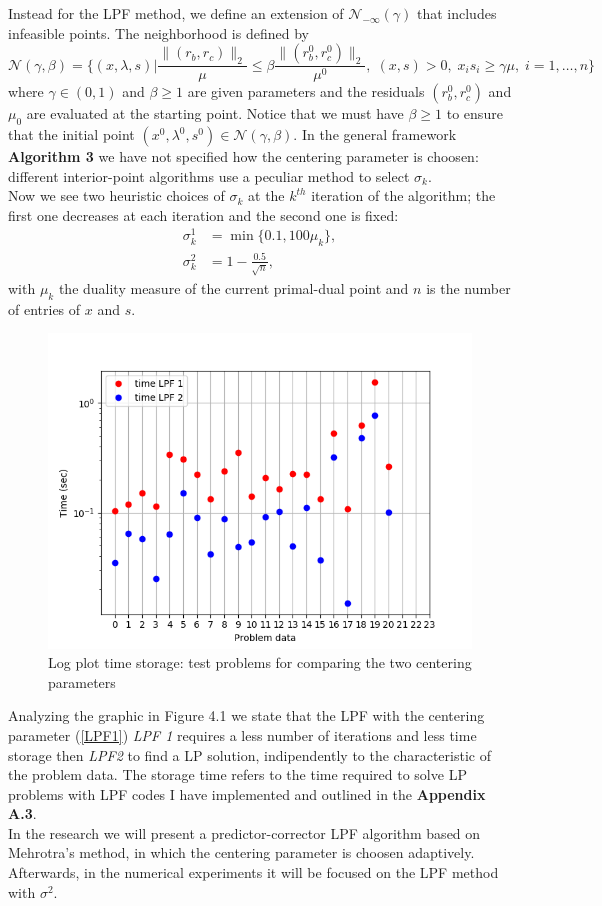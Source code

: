 \documentclass[a4paper,10 pt,titlepage,twoside]{book}
\theoremstyle{plain}
\theoremstyle{definition}
\theoremstyle{remark}
\begin{document}
Instead for the LPF method, we define an extension of $\mathcal{N}_{-\infty}(\gamma)$ that includes infeasible points. The neighborhood is defined by
 \begin{equation}\label{neigh3}
\mathcal{N}(\gamma,\beta) =\Bigg\{(x, \lambda, s) | \frac{\lVert(r_{b}, r_{c})\rVert_{2}}{\mu} \leq \beta\frac{\lVert(r_{b}^{0}, r_{c}^{0})\rVert_{2}}{\mu^{0}},\; (x, s)>0,\; x_{i}s_{i} \geq \gamma\mu,\;i = 1,\dots, n \Bigg\}
\end{equation}
where $\gamma\in(0,1)$ and $\beta \geq 1$ are given parameters and the residuals $(r_{b}^{0}, r_{c}^{0})$ and $\mu_{0}$ are evaluated at the starting point. Notice that we must have $\beta \geq 1$ to ensure that the initial point $(x^{0}, \lambda^{0}, s^{0})\in\mathcal{N}(\gamma,\beta)$.
In the general framework \textbf{Algorithm 3} we have not specified how the centering parameter is choosen: different interior-point algorithms use a peculiar method to select $\sigma_{k}$.\\
Now we see two heuristic choices of $\sigma_{k}$ at the $k^{th}$ iteration of the algorithm; the first one decreases at each iteration and the second one is fixed: 
\begin{align}
\sigma^{1}_{k} &= \min\{0.1, 100\mu_{k} \},\label{LPF1}\tag{4.13a}\\
\sigma^{2}_{k} &= 1 -\frac{0.5}{\sqrt{n}},\tag{4.13b}\label{LPF2}
\end{align}
with $\mu_{k}$ the duality measure of the current primal-dual point and $n$ is the number of entries of $x$ and $s$. 

\begin{figure}\label{fig:float}
\begin{center}
\includegraphics[width=9 cm]{timeLPF12}\caption{Log plot time storage: test problems for comparing the two centering parameters} 
\end{center}
\end{figure}
Analyzing the graphic in Figure 4.1 we state that the LPF with the centering parameter (\ref{LPF1}) \textit{LPF 1} requires a less number of iterations and less time storage then \textit{LPF2} to find a LP solution, indipendently to the characteristic of the problem data. The storage time refers to the time required to solve LP problems with LPF codes I have implemented and outlined in the \textbf{Appendix A.3}.\\
In the research we will present a predictor-corrector LPF algorithm based on Mehrotra's method, in which the centering parameter is choosen adaptively.\\
Afterwards, in the numerical experiments it will be focused on the LPF method with  $\sigma^{2}$.
\end{document}
